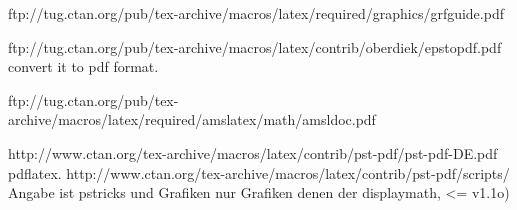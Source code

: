 ftp://tug.ctan.org/pub/tex-archive/macros/latex/required/graphics/grfguide.pdf
\usepackage[%
]{graphicx}

ftp://tug.ctan.org/pub/tex-archive/macros/latex/contrib/oberdiek/epstopdf.pdf
convert it to pdf format.
\usepackage{epstopdf}


ftp://tug.ctan.org/pub/tex-archive/macros/latex/required/amslatex/math/amsldoc.pdf
%
\usepackage[
centertags, %
numbers level
left).
sumlimits, %
summation-type
intlimits, %
namelimits, %
such as
underneath
fleqn, %
]{amsmath} %

http://www.ctan.org/tex-archive/macros/latex/contrib/pst-pdf/pst-pdf-DE.pdf
pdflatex.
http://www.ctan.org/tex-archive/macros/latex/contrib/pst-pdf/scripts/
%
Angabe ist
pstricks und
Grafiken nur
Grafiken
denen der
displaymath,
%
<= v1.1o)


